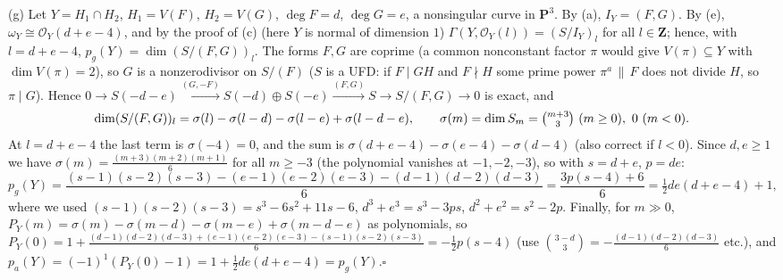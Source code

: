 \documentclass[11pt]{article}
\begin{document}
(g) Let $Y=H_1\cap H_2$, $H_1=V(F)$, $H_2=V(G)$, $\deg F=d$, $\deg G=e$, a nonsingular curve in $\mathbf P^3$. By (a), $I_Y=(F,G)$. By (e), $\omega_Y\cong\mathcal O_Y(d+e-4)$, and by the proof of (c) (here $Y$ is normal of dimension $1$) $\Gamma(Y,\mathcal O_Y(l))=(S/I_Y)_l$ for all $l\in\mathbf Z$; hence, with $l=d+e-4$, $p_g(Y)=\dim(S/(F,G))_l$. The forms $F,G$ are coprime (a common nonconstant factor $\pi$ would give $V(\pi)\subseteq Y$ with $\dim V(\pi)=2$), so $G$ is a nonzerodivisor on $S/(F)$ ($S$ is a UFD: if $F\mid GH$ and $F\nmid H$ some prime power $\pi^a\,\|\,F$ does not divide $H$, so $\pi\mid G$). Hence $0\to S(-d-e)\xrightarrow{(G,-F)}S(-d)\oplus S(-e)\xrightarrow{(F,G)}S\to S/(F,G)\to0$ is exact, and
\[\dim(S/(F,G))_l=\sigma(l)-\sigma(l-d)-\sigma(l-e)+\sigma(l-d-e),\qquad\sigma(m)=\dim S_m=\tbinom{m+3}3\ (m\ge0),\ 0\ (m<0).\]
At $l=d+e-4$ the last term is $\sigma(-4)=0$, and the sum is $\sigma(d+e-4)-\sigma(e-4)-\sigma(d-4)$ (also correct if $l<0$). Since $d,e\ge1$ we have $\sigma(m)=\frac{(m+3)(m+2)(m+1)}6$ for all $m\ge-3$ (the polynomial vanishes at $-1,-2,-3$), so with $s=d+e$, $p=de$:
\[p_g(Y)=\frac{(s-1)(s-2)(s-3)-(e-1)(e-2)(e-3)-(d-1)(d-2)(d-3)}6=\frac{3p(s-4)+6}6=\tfrac12de(d+e-4)+1,\]
where we used $(s-1)(s-2)(s-3)=s^3-6s^2+11s-6$, $d^3+e^3=s^3-3ps$, $d^2+e^2=s^2-2p$. Finally, for $m\gg0$, $P_Y(m)=\sigma(m)-\sigma(m-d)-\sigma(m-e)+\sigma(m-d-e)$ as polynomials, so $P_Y(0)=1+\frac{(d-1)(d-2)(d-3)+(e-1)(e-2)(e-3)-(s-1)(s-2)(s-3)}6=-\frac12p(s-4)$ (use $\binom{3-d}3=-\frac{(d-1)(d-2)(d-3)}6$ etc.), and $p_a(Y)=(-1)^1(P_Y(0)-1)=1+\frac12de(d+e-4)=p_g(Y)$.\hfill$\square$
\end{document}

